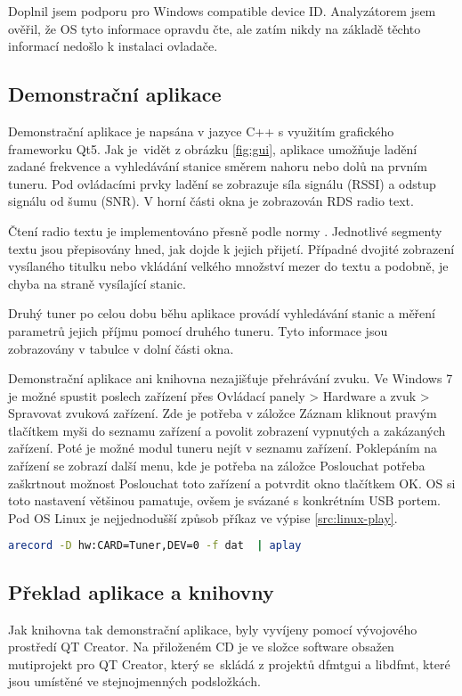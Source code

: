 Doplnil jsem podporu pro Windows compatible device ID. Analyzátorem jsem ověřil, že OS tyto informace opravdu čte, ale zatím nikdy na základě těchto informací nedošlo k instalaci ovladače.

\subsection{Demonstrační aplikace}


Demonstrační aplikace je napsána v jazyce C++ s využitím grafického frameworku Qt5. Jak je~vidět z obrázku \ref{fig:gui}, aplikace umožňuje ladění zadané frekvence a vyhledávání stanice směrem nahoru nebo dolů na prvním tuneru. Pod ovládacími prvky ladění se zobrazuje síla signálu (RSSI) a odstup signálu od šumu (SNR). V horní části okna je zobrazován RDS radio text. 

Čtení radio textu je implementováno přesně podle normy \cite{rds}. Jednotlivé segmenty textu jsou přepisovány hned, jak dojde k jejich přijetí. Případné dvojité zobrazení vysílaného titulku nebo vkládání velkého množství mezer do textu a podobně, je chyba na straně vysílající stanic.

Druhý tuner po celou dobu běhu aplikace provádí vyhledávání stanic a měření parametrů jejich příjmu pomocí druhého tuneru. Tyto informace jsou zobrazovány v tabulce v dolní části okna.

Demonstrační aplikace ani knihovna nezajišťuje přehrávání zvuku. Ve Windows 7 je možné spustit poslech zařízení přes Ovládací panely > Hardware a zvuk > Spravovat zvuková zařízení. Zde je potřeba v záložce Záznam kliknout pravým tlačítkem myši do seznamu zařízení a povolit zobrazení vypnutých a zakázaných zařízení. Poté je možné modul tuneru nejít v seznamu zařízení. Poklepáním na zařízení se zobrazí další menu, kde je potřeba na záložce Poslouchat potřeba zaškrtnout možnost Poslouchat toto zařízení a potvrdit okno tlačítkem OK. OS si toto nastavení většinou pamatuje, ovšem je svázané s konkrétním USB portem. Pod OS Linux je nejjednodušší způsob příkaz ve výpise \ref{src:linux-play}.

\begin{lstlisting}[language=bash, label=src:linux-play, caption=Přehrávání zvuku pod OS Linux.]
arecord -D hw:CARD=Tuner,DEV=0 -f dat  | aplay
\end{lstlisting}

\subsection{Překlad aplikace a knihovny}
Jak knihovna tak demonstrační aplikace, byly vyvíjeny pomocí vývojového prostředí QT Creator. Na přiloženém CD je ve složce software obsažen mutiprojekt pro QT Creator, který se~skládá z projektů dfmtgui a libdfmt, které jsou umístěné ve stejnojmenných podsložkách.

